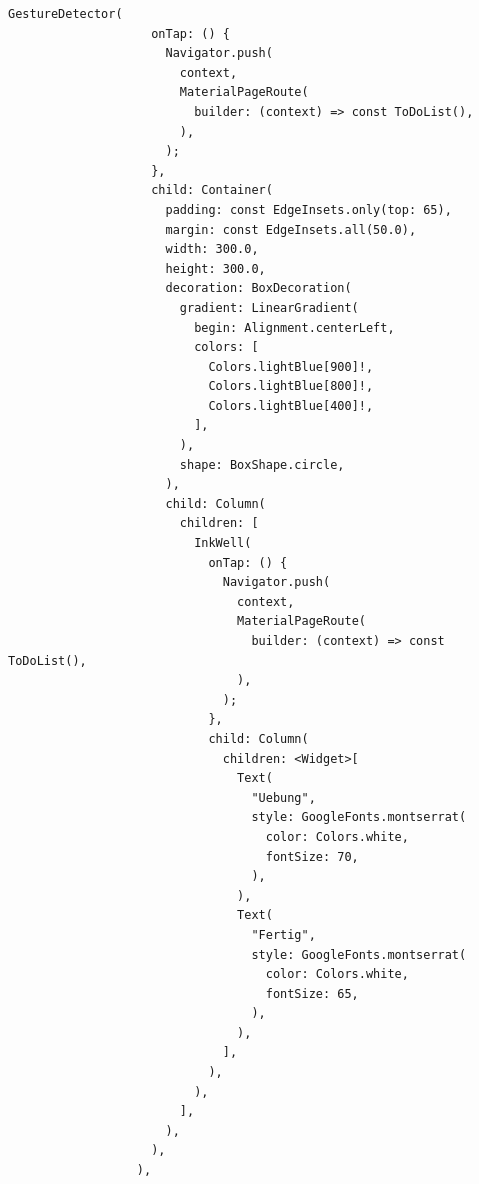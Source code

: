             \begin{lstlisting}[caption=GestureDetector zum Schluss,label=lst:impl:frontend:qrcode]
                GestureDetector(
                    onTap: () {
                      Navigator.push(
                        context,
                        MaterialPageRoute(
                          builder: (context) => const ToDoList(),
                        ),
                      );
                    },
                    child: Container(
                      padding: const EdgeInsets.only(top: 65),
                      margin: const EdgeInsets.all(50.0),
                      width: 300.0,
                      height: 300.0,
                      decoration: BoxDecoration(
                        gradient: LinearGradient(
                          begin: Alignment.centerLeft,
                          colors: [
                            Colors.lightBlue[900]!,
                            Colors.lightBlue[800]!,
                            Colors.lightBlue[400]!,
                          ],
                        ),
                        shape: BoxShape.circle,
                      ),
                      child: Column(
                        children: [
                          InkWell(
                            onTap: () {
                              Navigator.push(
                                context,
                                MaterialPageRoute(
                                  builder: (context) => const ToDoList(),
                                ),
                              );
                            },
                            child: Column(
                              children: <Widget>[
                                Text(
                                  "Uebung",
                                  style: GoogleFonts.montserrat(
                                    color: Colors.white,
                                    fontSize: 70,
                                  ),
                                ),
                                Text(
                                  "Fertig",
                                  style: GoogleFonts.montserrat(
                                    color: Colors.white,
                                    fontSize: 65,
                                  ),
                                ),
                              ],
                            ),
                          ),
                        ],
                      ),
                    ),
                  ),
            \end{lstlisting}
            
